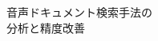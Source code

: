 \documentclass[a4paper,twocolumn,report,10.5pt]{jsbook}
\begin{document}

\begin{titlepage}
\begin{center}

{
\fontsize{28pt}{28pt}\selectfont %










{\gt
\vspace*{2.5zh}
音声ドキュメント検索手法の\\分析と精度改善\\ %

}}
\end{center}
\end{titlepage}
\end{document}
